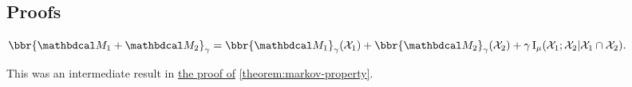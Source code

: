 \begin{subappendices}
    
    \section{Proofs}

    \begin{lemma}
            \label{lem:sum-info-formula}
        $\bbr{\dg M_1 + \dg M_2}_\gamma =
            \bbr{\dg M_1}_\gamma(\X_1) + \bbr{\dg M_2}_\gamma(\X_2) 
                + \gamma \I_\mu(\X_1; \X_2| \X_1 \cap \X_2).$
    \end{lemma}
    This was an intermediate result in \hyperref[proof:markov-property]{the proof of} \cref{theorem:markov-property}.



\end{subappendices}
